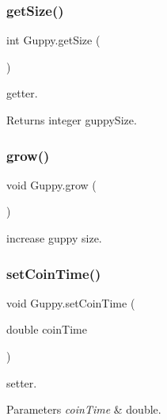 \subsubsection{\texorpdfstring{get\+Size()}{getSize()}}
{\footnotesize\ttfamily int Guppy.\+get\+Size (\begin{DoxyParamCaption}{ }\end{DoxyParamCaption})\hspace{0.3cm}{\ttfamily [inline]}}

getter. \begin{DoxyReturn}{Returns}
integer guppy\+Size. 
\end{DoxyReturn}
\mbox{\label{class_guppy_aa36c77e990d4959dc81adbe457e989c3}} 
\subsubsection{\texorpdfstring{grow()}{grow()}}
{\footnotesize\ttfamily void Guppy.\+grow (\begin{DoxyParamCaption}{ }\end{DoxyParamCaption})\hspace{0.3cm}{\ttfamily [inline]}}

increase guppy size. \mbox{\label{class_guppy_a254e1b5a56245740dcdc2c41cffaf15b}} 
\subsubsection{\texorpdfstring{set\+Coin\+Time()}{setCoinTime()}}
{\footnotesize\ttfamily void Guppy.\+set\+Coin\+Time (\begin{DoxyParamCaption}\item[{double}]{coin\+Time }\end{DoxyParamCaption})\hspace{0.3cm}{\ttfamily [inline]}}

setter. 
\begin{DoxyParams}{Parameters}
{\em coin\+Time} & double. \\
\hline
\end{DoxyParams}
\mbox{\label{class_guppy_a22e7cfdc2493eed638c69edee5848f2d}} 
